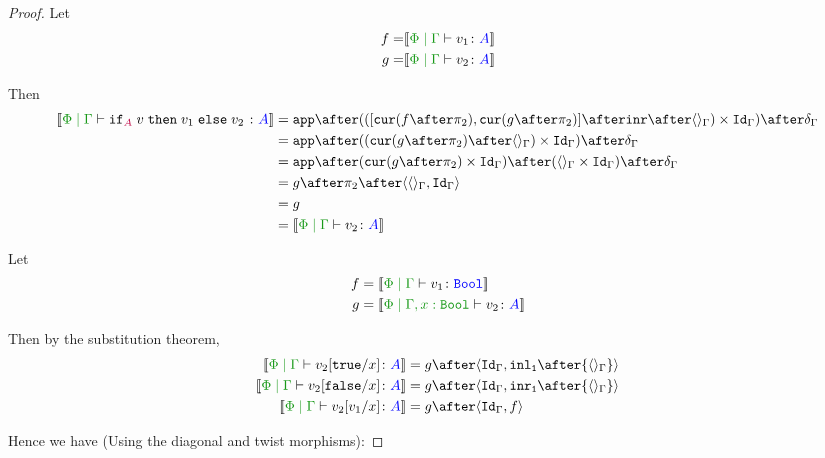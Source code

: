 \documentclass{report}
\begin{document}
\begin{framed}
\begin{proof}
        
        \case{\eqiffalse}
        Let
        \begin{align*}
            f = &\deno{\gpetyperelation{v_1}{A}}\\
            g = &\deno{\gpetyperelation{v_2}{A}}\\
        \end{align*}
        
        Then
        \begin{align*}
                \deno{\gpetyperelation{\pifthenelse{A}{v}{v_1}{v_2}}{A}} & = \ifMorph{\inr\after\term{\G}}{f}{g} \\
                & = \app\after((\cur{g\after\pp}\after\term{\G})\times\idg)\after\diag{\G}\\
                & = \app\after(\cur{g\after\pp}\times\idg)\after(\term{\G}\times\idg)\after\diag{\G}\\
                & = g\after\pp\after\pr{\term{\G}}{\idg}\\
                & = g \\
                & = \deno{\gpetyperelation{v_2}{A}}\\
        \end{align*}
        
        \case{\eqifeta}
            Let 
            \begin{align*}
                f & = \deno{\etyperelation{\P}{\G}{v_1}{\B}} \\
                g & = \deno{\etyperelation{\P}{\G, x: \B}{v_2}{A}} \\
            \end{align*}
        
        
            Then by the substitution theorem,
            \begin{align*}
                \deno{\etyperelation{\P}{\G}{v_2\ssub{x}{\t}}{A}} & = g\after\pr{\idg}{\inl_\1\after{\term{\G}}}\\
                \deno{\etyperelation{\P}{\G}{v_2\ssub{x}{\f}}{A}} & = g\after\pr{\idg}{\inr_\1\after{\term{\G}}}\\
                \deno{\gpetyperelation{v_2\ssub{x}{v_1}}{A}} & = g\after\pr{\idg}{f}
            \end{align*}
        
            Hence we have (Using the diagonal and twist morphisms):
         

\end{proof}
\end{framed}
\end{document}
